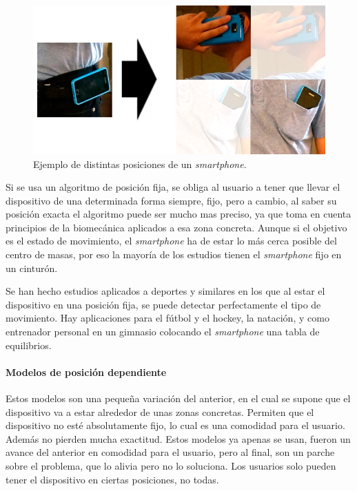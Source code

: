 \documentclass[12pt]{book}
\numberwithin{equation}{section}
\begin{document}
\begin{figure}[h]
    \centering
    \includegraphics[width=1\textwidth]{position.png}
    \caption{Ejemplo de distintas posiciones de un \textit{smartphone}.}
    \label{fig:posiciones}
\end{figure}



Si se usa un algoritmo de posición fija, se obliga al usuario a tener que llevar el dispositivo de una determinada forma siempre, fijo, pero a cambio, al saber su posición exacta el algoritmo puede ser mucho mas preciso, ya que toma en cuenta principios de la biomecánica aplicados a esa zona concreta. Aunque si el objetivo es el estado de movimiento, el \textit{smartphone} ha de estar lo más cerca posible del centro de masas, por eso la mayoría de los estudios tienen el \textit{smartphone} fijo en un cinturón\cite{5673816}.

Se han hecho estudios aplicados a deportes y similares en los que al estar el dispositivo en una posición fija, se puede detectar perfectamente el tipo de movimiento. Hay aplicaciones para el fútbol\cite{s130405317} y el hockey, la natación\cite{Marshall:2013:SSD:2494091.2496036}, y como entrenador personal en un gimnasio colocando el \textit{smartphone} una tabla de equilibrios\cite{KRANZ2013203}.

\paragraph{Modelos de posición dependiente}

Estos modelos son una pequeña variación del anterior, en el cual se supone que el dispositivo va a estar alrededor de unas zonas concretas. Permiten que el dispositivo no esté absolutamente fijo, lo cual es una comodidad para el usuario. Además no pierden mucha exactitud. Estos modelos ya apenas se usan, fueron un avance del anterior en comodidad para el usuario, pero al final, son un parche sobre el problema, que lo alivia pero no lo soluciona. Los usuarios solo pueden tener el dispositivo en ciertas posiciones, no todas.
\end{document}
